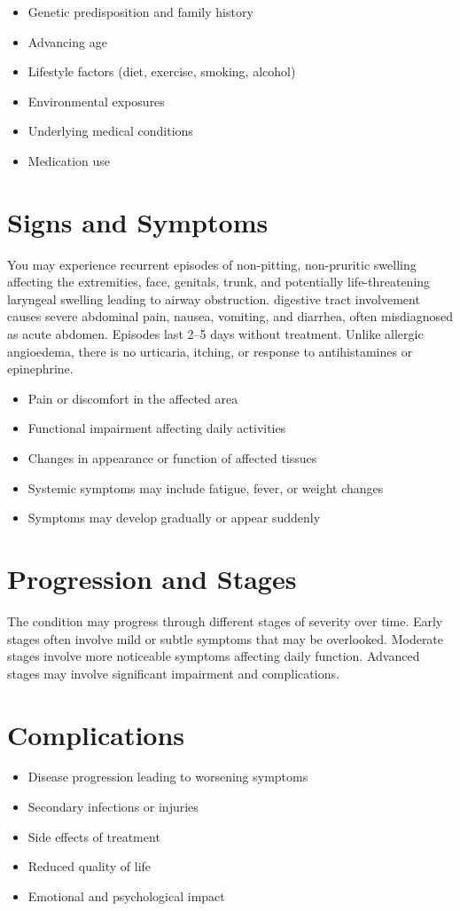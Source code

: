 \begin{itemize}[noitemsep]
  \item Genetic predisposition and family history
  \item Advancing age
  \item Lifestyle factors (diet, exercise, smoking, alcohol)
  \item Environmental exposures
  \item Underlying medical conditions
  \item Medication use
\end{itemize}
\section{Signs and Symptoms}
You may experience recurrent episodes of non-pitting, non-pruritic swelling affecting the extremities, face, genitals, trunk, and potentially life-threatening laryngeal swelling leading to airway obstruction. digestive tract involvement causes severe abdominal pain, nausea, vomiting, and diarrhea, often misdiagnosed as acute abdomen. Episodes last 2--5 days without treatment. Unlike allergic angioedema, there is no urticaria, itching, or response to antihistamines or epinephrine.

\begin{itemize}[noitemsep]
  \item Pain or discomfort in the affected area
  \item Functional impairment affecting daily activities
  \item Changes in appearance or function of affected tissues
  \item Systemic symptoms may include fatigue, fever, or weight changes
  \item Symptoms may develop gradually or appear suddenly
\end{itemize}
\section{Progression and Stages}
The condition may progress through different stages of severity over time. Early stages often involve mild or subtle symptoms that may be overlooked. Moderate stages involve more noticeable symptoms affecting daily function. Advanced stages may involve significant impairment and complications.
\section{Complications}
\begin{itemize}[noitemsep]
  \item Disease progression leading to worsening symptoms
  \item Secondary infections or injuries
  \item Side effects of treatment
  \item Reduced quality of life
  \item Emotional and psychological impact
\end{itemize}
